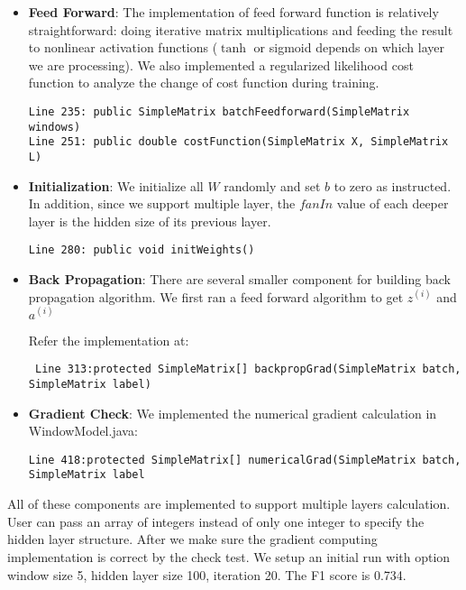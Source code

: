 \documentclass[letterpaper]{article}
\begin{document}
\begin{itemize}
\item \textbf{Feed Forward}: The implementation of feed forward function is relatively straightforward: doing iterative matrix multiplications and feeding the result to  nonlinear activation functions ($\tanh$ or sigmoid depends on which layer we are processing). We also implemented a regularized likelihood cost function to analyze the change of cost function during training.
\begin{verbatim}
Line 235: public SimpleMatrix batchFeedforward(SimpleMatrix windows)
Line 251: public double costFunction(SimpleMatrix X, SimpleMatrix L)
\end{verbatim}
\item \textbf{Initialization}: We initialize all $W$ randomly and set $b$ to zero as instructed. In addition, since we support multiple layer, the $fanIn$ value of each deeper layer is the hidden size of its previous layer.
\begin{verbatim}
Line 280: public void initWeights()
\end{verbatim}
\item \textbf{Back Propagation}: There are several smaller component for building back propagation algorithm.
We first ran a feed forward algorithm to get $z^{(i)}$ and $a^{(i)}$

Refer the implementation at:
\begin{verbatim}
 Line 313:protected SimpleMatrix[] backpropGrad(SimpleMatrix batch, SimpleMatrix label)
 \end{verbatim}
  
\item \textbf{Gradient Check}: 
We implemented the numerical gradient calculation in WindowModel.java:
\begin{verbatim}
Line 418:protected SimpleMatrix[] numericalGrad(SimpleMatrix batch, SimpleMatrix label
\end{verbatim}

\end{itemize}

All of these components are implemented to support multiple layers calculation. User can pass an array of integers instead of only one integer to specify the hidden layer structure.
After we make sure the gradient computing implementation is correct by the check test. We setup an initial run with option window size 5, hidden layer size 100, iteration 20. The F1 score is 0.734.
\end{document}
